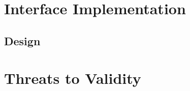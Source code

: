  \label{ch:methods:renderer:parallel:libraries}

 \label{ch:methods:renderer:parallel:design}

 \label{ch:methods:renderer:parallel:demo}

\section{Interface Implementation} \label{ch:methods:interface}

\subsection{Design} \label{ch:methods:interface:design}

\section{Threats to Validity} \label{ch:methods:threats}
